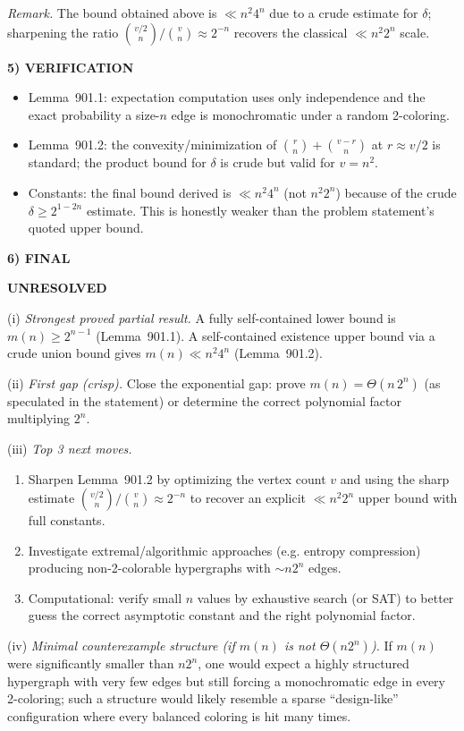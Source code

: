 \emph{Remark.} The bound obtained above is $\ll n^2 4^n$ due to a crude estimate
for $\delta$; sharpening the ratio
$\binom{v/2}{n}/\binom{v}{n}\approx 2^{-n}$ recovers the classical $\ll n^2 2^n$
scale.

\medskip
\noindent\textbf{5) VERIFICATION}

\begin{itemize}
\item Lemma~901.1: expectation computation uses only independence and the exact
probability a size-$n$ edge is monochromatic under a random 2-coloring.
\item Lemma~901.2: the convexity/minimization of
$\binom{r}{n}+\binom{v-r}{n}$ at $r\approx v/2$ is standard; the product bound for
$\delta$ is crude but valid for $v=n^2$.
\item Constants: the final bound derived is $\ll n^2 4^n$ (not $n^2 2^n$) because
of the crude $\delta\ge 2^{1-2n}$ estimate. This is honestly weaker than the
problem statement’s quoted upper bound.
\end{itemize}

\medskip
\noindent\textbf{6) FINAL}

\textbf{UNRESOLVED}

(i) \emph{Strongest proved partial result.}
A fully self-contained lower bound is $m(n)\ge 2^{n-1}$ (Lemma~901.1).
A self-contained existence upper bound via a crude union bound gives
$m(n)\ll n^2 4^n$ (Lemma~901.2).

(ii) \emph{First gap (crisp).}
Close the exponential gap: prove $m(n)=\Theta(n\,2^n)$ (as speculated in the
statement) or determine the correct polynomial factor multiplying $2^n$.

(iii) \emph{Top 3 next moves.}
\begin{enumerate}
\item Sharpen Lemma~901.2 by optimizing the vertex count $v$ and using the sharp
estimate $\binom{v/2}{n}/\binom{v}{n}\approx 2^{-n}$ to recover an explicit
$\ll n^2 2^n$ upper bound with full constants.
\item Investigate extremal/algorithmic approaches (e.g. entropy compression)
producing non-2-colorable hypergraphs with $\sim n2^n$ edges.
\item Computational: verify small $n$ values by exhaustive search (or SAT) to
better guess the correct asymptotic constant and the right polynomial factor.
\end{enumerate}

(iv) \emph{Minimal counterexample structure (if $m(n)$ is not $\Theta(n2^n)$).}
If $m(n)$ were significantly smaller than $n2^n$, one would expect a highly
structured hypergraph with very few edges but still forcing a monochromatic edge
in every 2-coloring; such a structure would likely resemble a sparse “design-like”
configuration where every balanced coloring is hit many times.




